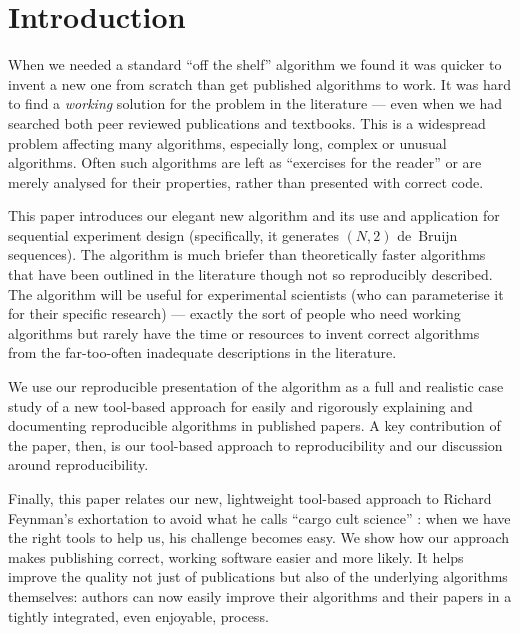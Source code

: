 \documentclass[preprint,times]{elsarticle}
\def\newstart{\color{red}}
\def\newstart{}
\begin{document}


\maketitle

\section{Introduction}
When we needed a standard ``off the shelf'' algorithm we found it was quicker to invent a new one from scratch than get published algorithms to work. It was hard to find a \emph{working\/} solution for the problem in the literature --- even when we had searched both peer reviewed publications and textbooks. This is a widespread problem affecting many algorithms, especially long, complex or unusual algorithms. Often such algorithms are left as ``exercises for the reader'' or are merely analysed for their properties, rather than presented with correct code.

This paper introduces our elegant new algorithm and its use and application for sequential experiment design (specifically, it generates $(N,2)$ de~Bruijn sequences). \newstart The algorithm is much briefer than theoretically faster algorithms that have been outlined in the literature though not so reproducibly described. The algorithm will be useful for experimental scientists (who can parameterise it for their specific research) --- exactly the sort of people who need working algorithms but rarely have the time or resources to invent correct algorithms from the far-too-often inadequate descriptions in the literature.

We use our reproducible presentation of the algorithm as a full and realistic case study of a new tool-based approach for easily and rigorously explaining and documenting reproducible algorithms in published papers. A key contribution of the paper, then, is our tool-based approach to reproducibility and our discussion around reproducibility.

Finally, this paper relates our new, lightweight tool-based approach to Richard Feynman's exhortation to avoid what he calls ``cargo cult science'' \cite{feynman}: when we have the right tools to help us, his challenge becomes easy. We show how our approach makes publishing correct, working software easier and more likely. It helps improve the quality not just of publications but also of the underlying algorithms themselves: authors can now easily improve their algorithms and their papers in a tightly integrated, even enjoyable, process.
 
\end{document}
